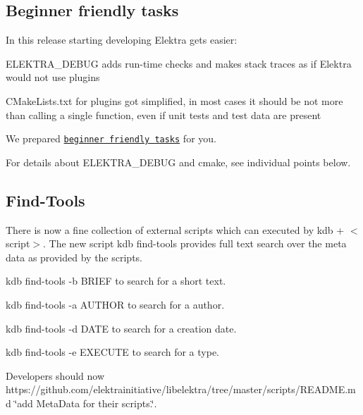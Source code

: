 \subsection*{Beginner friendly tasks}

In this release starting developing Elektra gets easier\+:


\begin{DoxyItemize}
\item {\ttfamily E\+L\+E\+K\+T\+R\+A\+\_\+\+D\+E\+B\+UG} adds run-\/time checks and makes stack traces as if Elektra would not use plugins
\item {\ttfamily C\+Make\+Lists.\+txt} for plugins got simplified, in most cases it should be not more than calling a single function, even if unit tests and test data are present
\item We prepared \href{https://github.com/ElektraInitiative/libelektra/issues?q=is%3Aissue+is%3Aopen+label%3A%22beginner+friendly%22}{\tt beginner friendly tasks} for you.
\end{DoxyItemize}

For details about {\ttfamily E\+L\+E\+K\+T\+R\+A\+\_\+\+D\+E\+B\+UG} and cmake, see individual points below.

\subsection*{Find-\/\+Tools}

There is now a fine collection of external scripts which can executed by {\ttfamily kdb + $<$script$>$}. The new script {\ttfamily kdb find-\/tools} provides full text search over the meta data as provided by the scripts.


\begin{DoxyItemize}
\item {\ttfamily kdb find-\/tools -\/b B\+R\+I\+EF} to search for a short text.
\item {\ttfamily kdb find-\/tools -\/a A\+U\+T\+H\+OR} to search for a author.
\item {\ttfamily kdb find-\/tools -\/d D\+A\+TE} to search for a creation date.
\item {\ttfamily kdb find-\/tools -\/e E\+X\+E\+C\+U\+TE} to search for a type.
\end{DoxyItemize}

Developers should now https\+://github.com/elektrainitiative/libelektra/tree/master/scripts/\+R\+E\+A\+D\+M\+E.\+md \char`\"{}add Meta\+Data for their scripts.\char`\"{}.


